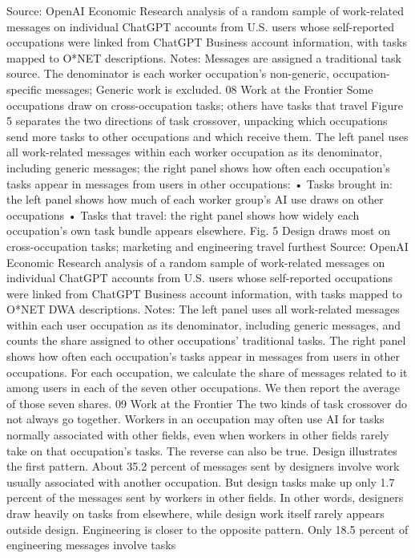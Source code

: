 Source: OpenAI Economic Research analysis of a random sample of work-related messages on individual ChatGPT accounts
from U.S. users whose self-reported occupations were linked from ChatGPT Business account information, with tasks mapped
to O*NET descriptions. Notes: Messages are assigned a traditional task source. The denominator is each worker occupation’s
non-generic, occupation-specific messages; Generic work is excluded.
08
Work at the Frontier
Some occupations draw on
cross-occupation tasks; others have
tasks that travel
Figure 5 separates the two directions of task crossover, unpacking which occupations send more tasks
to other occupations and which receive them. The left panel uses all work-related messages within each
worker occupation as its denominator, including generic messages; the right panel shows how often each
occupation’s tasks appear in messages from users in other occupations:
• Tasks brought in: the left panel shows how much of each worker group’s AI use draws on other
occupations
• Tasks that travel: the right panel shows how widely each occupation’s own task bundle appears
elsewhere.
Fig. 5
Design draws most on cross-occupation tasks; marketing and engineering travel furthest
Source: OpenAI Economic Research analysis of a random sample of work-related messages on individual ChatGPT accounts
from U.S. users whose self-reported occupations were linked from ChatGPT Business account information, with tasks
mapped to O*NET DWA descriptions. Notes: The left panel uses all work-related messages within each user occupation as its
denominator, including generic messages, and counts the share assigned to other occupations’ traditional tasks. The right
panel shows how often each occupation’s tasks appear in messages from users in other occupations. For each occupation, we
calculate the share of messages related to it among users in each of the seven other occupations. We then report the average
of those seven shares.
09
Work at the Frontier
The two kinds of task crossover do not always go together. Workers in an occupation may often use
AI for tasks normally associated with other fields, even when workers in other fields rarely take on that
occupation’s tasks. The reverse can also be true.
Design illustrates the first pattern. About 35.2 percent of messages sent by designers involve work
usually associated with another occupation. But design tasks make up only 1.7 percent of the messages
sent by workers in other fields. In other words, designers draw heavily on tasks from elsewhere, while
design work itself rarely appears outside design.
Engineering is closer to the opposite pattern. Only 18.5 percent of engineering messages involve tasks
